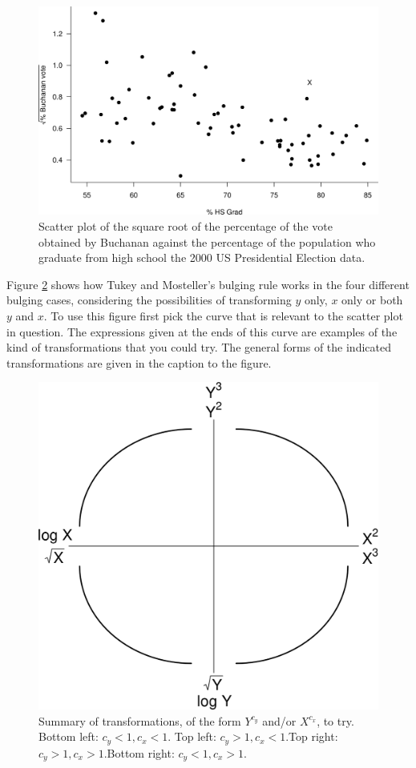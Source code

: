 \documentclass[
  british,
]{book}
\begin{document}
\begin{figure}

{\centering \includegraphics[width=0.8\linewidth]{images/election_HS2} 

}

\caption{Scatter plot of the square root of the percentage of the vote obtained by Buchanan against the percentage of the population who graduate from high school the 2000 US Presidential Election data.}\label{fig:electionHS2}
\end{figure}
\FloatBarrier

Figure \ref{fig:tukey} shows how Tukey and Mosteller's bulging rule works in the four different bulging cases, considering the possibilities of transforming \(y\) only, \(x\) only or both \(y\) and \(x\). To use this figure first pick the curve that is relevant to the scatter plot in question. The expressions given at the ends of this curve are examples of the kind of transformations that you could try. The general forms of the indicated transformations are given in the caption to the figure.

\begin{figure}

{\centering \includegraphics[width=0.8\linewidth]{images/tukey} 

}

\caption{Summary of transformations, of the form $Y^{c_y}$ and/or $X^{c_x}$, to try. Bottom left: $c_y < 1, c_x < 1$. Top left: $c_y > 1, c_x < 1$.Top right: $c_y > 1, c_x > 1$.Bottom right: $c_y < 1, c_x > 1$.}\label{fig:tukey}
\end{figure}
\FloatBarrier
\end{document}
